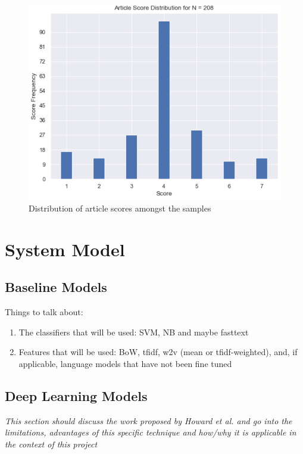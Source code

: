 \documentclass[a4paper,twoside,phd]{BYUPhys}
\begin{document}
\begin{figure}[!htb]
	\centering
	\includegraphics[totalheight=8cm]{images/article-score-distribution-208.png}
	\caption{Distribution of article scores amongst the samples}
	\label{fig:ArticleDistribution}
\end{figure}

\section{System Model}
\label{sec:SystemModel}


\subsection{Baseline Models}
\label{sec:BaselineModels}

Things to talk about:
\begin{enumerate}
	\item The classifiers that will be used: SVM, NB and maybe fasttext
	\item Features that will be used: BoW, tfidf, w2v (mean or tfidf-weighted), and, if applicable, language models that have not been fine tuned
\end{enumerate}
\subsection{Deep Learning Models}
\label{sec:DLModels}

\textit{This section should discuss the work proposed by Howard et al. and go into the limitations, advantages of this specific technique and how/why it is applicable in the context of this project}
\end{document}
